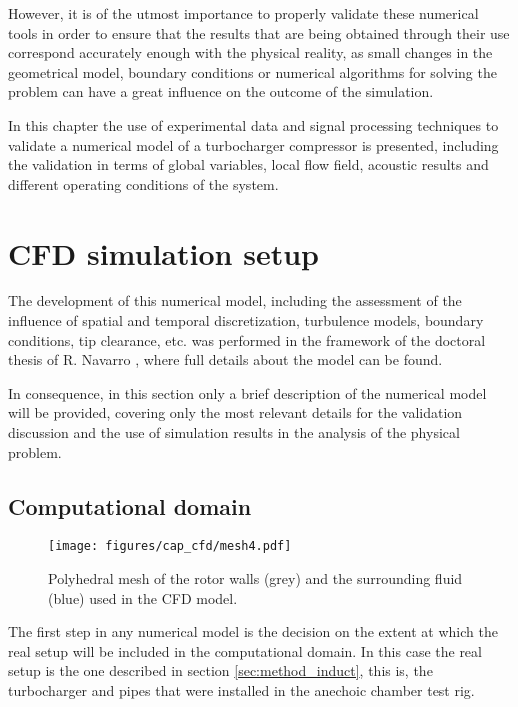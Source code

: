 However, it is of the utmost importance to properly validate these numerical tools in order to ensure that the results that are being obtained through their use correspond accurately enough with the physical reality, as small changes in the geometrical model, boundary conditions or numerical algorithms for solving the problem can have a great influence on the outcome of the simulation.

In this chapter the use of experimental data and signal processing techniques to validate a numerical model of a turbocharger compressor is presented, including the validation in terms of global variables, local flow field, acoustic results and different operating conditions of the system. 

\section{CFD simulation setup} %

The development of this numerical model, including the assessment of the influence of spatial and temporal discretization, turbulence models, boundary conditions, tip clearance, etc. was performed in the framework of the doctoral thesis of R. Navarro \cite{navarro2014numerical}, where full details about the model can be found.

In consequence, in this section only a brief description of the numerical model will be provided, covering only the most relevant details for the validation discussion and the use of simulation results in the analysis of the physical problem.

\subsection{Computational domain}

\begin{wrapfigure}[16]{I}[0cm]{0.4\textwidth}
\raggedleft
\vspace{-4mm}
\texttt{[image: figures/cap\_cfd/mesh4.pdf]}
\caption{Polyhedral mesh of the rotor walls (grey) and the surrounding fluid (blue) used in the CFD model.}
\label{fig:cfd_mesh}
\end{wrapfigure}

The first step in any numerical model is the decision on the extent at which the real setup will be included in the computational domain. In this case the real setup is the one described in section \ref{sec:method_induct}, this is, the turbocharger and pipes that were installed in the anechoic chamber test rig. 

